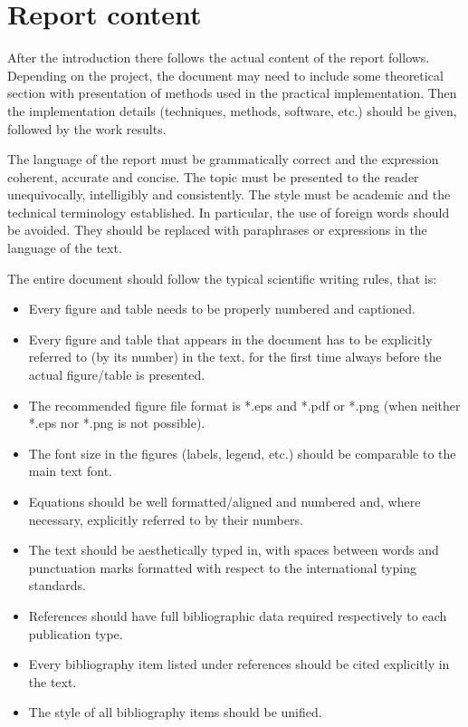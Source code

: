 \documentclass[12pt, sumlimits, intlimits]{article}
\begin{document}
\section{Report content}

After the introduction there follows the actual content of the report follows.
Depending on the project, the document may need to include some theoretical
section with presentation of methods used in the practical implementation. Then
the implementation details (techniques, methods, software, etc.) should be
given, followed by the work results.

The language of the report must be grammatically correct and the expression
coherent, accurate and concise. The topic must be presented to the reader
unequivocally, intelligibly and consistently. The style must be academic and
the technical terminology established. In particular, the use of foreign words
should be avoided. They should be replaced with paraphrases or expressions in
the language of the text.

The entire document should follow the typical scientific writing rules, that
is:
\begin{itemize}
\item Every figure and table needs to be properly numbered and captioned.
\item Every figure and table that appears in the document has to be explicitly
referred to (by its number) in the text, for the first time always before the
actual figure/table is presented.
\item The recommended figure file format is *.eps and *.pdf or *.png (when
neither *.eps nor *.png is not possible).
\item The font size in the figures (labels, legend, etc.) should be comparable
to the main text font.
\item Equations should be well formatted/aligned and numbered and, where
necessary, explicitly referred to by their numbers.
\item The text should be aesthetically typed in, with spaces between words and
punctuation marks formatted with respect to the international typing
standards.
\item References should have full bibliographic data required respectively to
each publication type.
\item Every bibliography item listed under references should be cited
explicitly in the text.
\item The style of all bibliography items should be unified.
\end{itemize}
\end{document}
